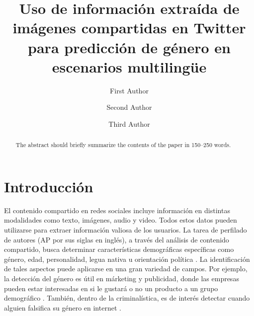 \documentclass[runningheads]{llncs}
\begin{document}
%
\title{Uso de información extraída de imágenes compartidas en Twitter para predicción de género en escenarios multilingüe}


\author{First Author \and
Second Author \and
Third Author}
%
%

\maketitle

\begin{abstract}
The abstract should briefly summarize the contents of the paper in
150--250 words.

\end{abstract}

\section{Introducción}

El contenido compartido en redes sociales incluye información 
en distintas modalidades como texto, imágenes, audio y video.
Todos estos datos pueden utilizarse para extraer información
valiosa de los usuarios. 
La tarea de perfilado de autores (AP por sus siglas en inglés), a través
del análisis de contenido compartido, busca determinar características demográficas 
específicas como género, edad, personalidad, legua nativa u orientación 
política \cite{rangel_rosso_montes-y-gomez_potthast_stein}. La identificación de tales 
aspectos puede aplicarse en una gran variedad de campos. Por ejemplo, la detección del 
género es útil en márketing y publicidad, donde las empresas pueden estar interesadas
en si le gustará o no un producto a un grupo demográfico \cite{miller_dickinson_hu_2012}.
También, dentro de la criminalística, es de interés detectar cuando alguien falsifica su género en internet \cite{cheng_chandramouli_subbalakshmi_2011}. 
\end{document}
